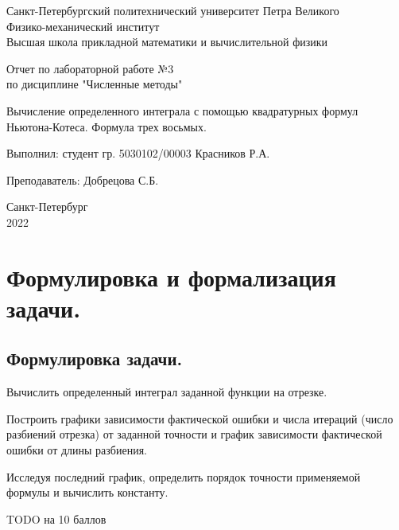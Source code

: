\documentclass[a4paper, 12pt]{article}
\begin{document}
	\begin{titlepage}
		\begin{center}
			Санкт-Петербургский политехнический университет Петра Великого \\ Физико-механический институт \\ Высшая школа прикладной математики и вычислительной физики
		\end{center}
		\vspace{10em}
		\begin{center}
			\Large Отчет по лабораторной работе №3 \\ по дисциплине "Численные методы"
		\end{center}
		\vspace{1em}
		\begin{center}
			\Huge Вычисление определенного интеграла с помощью квадратурных формул Ньютона-Котеса. Формула трех восьмых.
		\end{center}
		\vspace{15em}
		{\Large 
			
			Выполнил: студент гр. 5030102/00003 Красников Р.А.
			\vspace{1em}
			
			Преподаватель: Добрецова С.Б.}
		\vspace{\fill}
		\begin{center}
			Санкт-Петербург \\ 2022
		\end{center}
	\end{titlepage}
	\newpage
	
	\section{Формулировка и формализация задачи.}
	
	\subsection{Формулировка задачи.}
	
	Вычислить определенный интеграл заданной функции на отрезке.
	
	Построить графики зависимости фактической ошибки и числа итераций (число разбиений отрезка) от заданной точности и график зависимости фактической ошибки от длины разбиения.
	
	Исследуя последний график, определить порядок точности применяемой формулы и вычислить константу.
	
	TODO на 10 баллов
	
\end{document}
